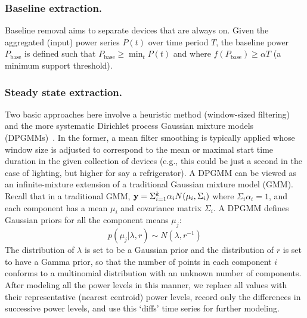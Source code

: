 \subsubsection*{Baseline extraction.} Baseline removal
aims to separate devices that are
always on. Given the aggregated (input) power series $P(t)$ over time period $T$,
the baseline power $P_\textrm{base}$ is defined such that
$P_\textrm{base} \ge \min_{t} P(t)$ and where
$f(P_\textrm{base}) \ge \alpha T$ (a minimum support threshold).

\subsubsection*{Steady state extraction.} Two basic approaches here
involve a heuristic method (window-sized filtering) and the more systematic
Dirichlet process Gaussian mixture models (DPGMMs)~\cite{gorur2010dirichlet}.
In the former, a mean filter smoothing is typically applied
whose window size is adjusted to correspond to the mean or maximal start
time duration in the given collection of devices (e.g., this could be just a second
in the case of lighting, but higher for say a refrigerator).
A DPGMM can be viewed as an infinite-mixture extension of a traditional
Gaussian mixture model (GMM). Recall that in a traditional GMM,
${\bf y}= \Sigma^{k}_{i=1} \alpha_i N(\mu_i, \Sigma_i)$ where
$\Sigma_i \alpha_i =1$, and
each component has a mean $\mu_i$
and covariance matrix $\Sigma_i$. A DPGMM defines Gaussian priors for all
the component means $\mu_j$:
\begin{displaymath}
p(\mu_j|\lambda, r) \sim N(\lambda, r^{-1})
\end{displaymath}
The distribution of $\lambda$ is set to be a Gaussian prior
and the distribution of $r$ is set to have a Gamma prior, so
that the number of points in each component
$i$ conforms to a multinomial distribution with an unknown number of
components. After modeling all the power levels in this manner, we
replace all values with their representative (nearest centroid) power levels,
record only the differences in successive power levels, and use this
`diffs' time series for further modeling.

